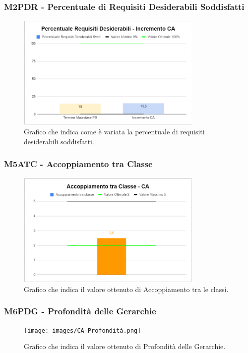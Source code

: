 \subsubsection{M2PDR - Percentuale di Requisiti Desiderabili Soddisfatti}
\begin{figure}[H]
    \centering\includegraphics[width=0.8\textwidth, height=0.8\textheight,keepaspectratio]{images/CA-Requisiti-Desiderabili-Soddisfatti.png}
    \caption{Grafico che indica come è variata la percentuale di requisiti desiderabili soddisfatti.}
\end{figure}  

\subsubsection{M5ATC - Accoppiamento tra Classe}
\begin{figure}[H]
 \centering\includegraphics[width=0.8\textwidth, height=0.8\textheight,keepaspectratio]{images/CA-Accoppiamento.png}
  \caption{Grafico che indica il valore ottenuto di Accoppiamento tra le classi.}
\end{figure}  

\subsubsection{M6PDG - Profondità delle Gerarchie }
\begin{figure}[H]
 \centering\texttt{[image: images/CA-Profondità.png]}
  \caption{Grafico che indica il valore ottenuto di Profondità delle Gerarchie.}
\end{figure}  

